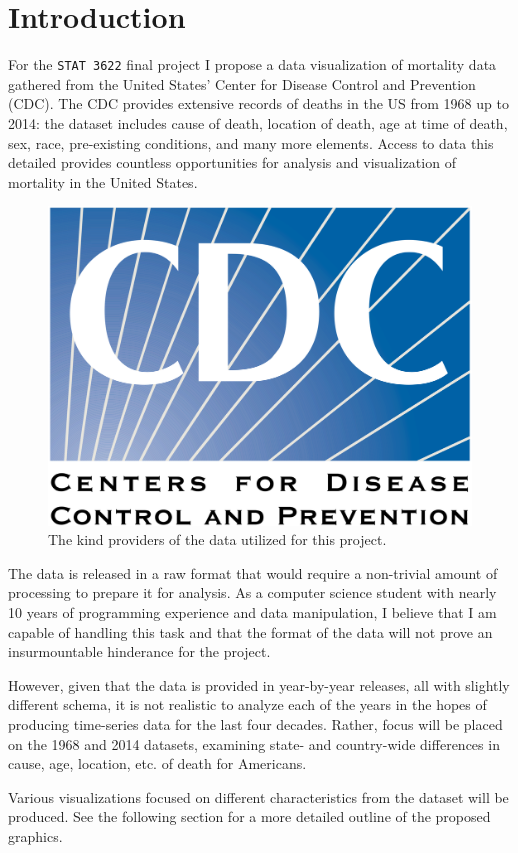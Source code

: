 \section{Introduction}

For the \texttt{STAT 3622} final project I propose a data visualization of mortality data gathered from the United States' Center for Disease Control and Prevention (CDC). The CDC provides extensive records of deaths in the US from 1968 up to 2014: the dataset includes cause of death, location of death, age at time of death, sex, race, pre-existing conditions, and many more elements. Access to data this detailed provides countless opportunities for analysis and visualization of mortality in the United States.

\begin{figure}[H]
\centering
\includegraphics[width=0.25\linewidth]{cdc.png}
\caption{The kind providers of the data utilized for this project.}
\end{figure}

The data is released in a raw format that would require a non-trivial amount of processing to prepare it for analysis. As a computer science student with nearly 10 years of programming experience and data manipulation, I believe that I am capable of handling this task and that the format of the data will not prove an insurmountable hinderance for the project.

However, given that the data is provided in year-by-year releases, all with slightly different schema, it is not realistic to analyze each of the years in the hopes of producing time-series data for the last four decades. Rather, focus will be placed on the 1968 and 2014 datasets, examining state- and country-wide differences in cause, age, location, etc. of death for Americans.

Various visualizations focused on different characteristics from the dataset will be produced. See the following section for a more detailed outline of the proposed graphics.


